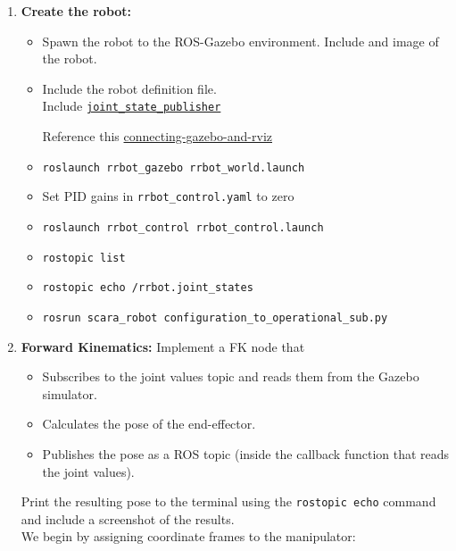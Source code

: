 \documentclass[10pt]{article}
\begin{document}
\setlength{\abovedisplayskip}{6pt}
\setlength{\belowdisplayskip}{3pt}
\setlength{\abovedisplayshortskip}{4pt}
\setlength{\belowdisplayshortskip}{4pt}

\begin{enumerate}
	\item \textbf{Create the robot:}
	
	\begin{itemize}
		\item Spawn the robot to the ROS-Gazebo environment. Include and image of the robot.
		
		\item Include the robot definition file.
		\\
		
		Include \href{http://wiki.ros.org/joint_state_publisher}{\texttt{joint\_state\_publisher}}
		
		Reference this \href{https://answers.ros.org/question/348008/connecting-gazebo-and-rviz/}{connecting-gazebo-and-rviz}
		
		\item \texttt{roslaunch rrbot\_gazebo rrbot\_world.launch}
		\item Set PID gains in \texttt{rrbot\_control.yaml} to zero
		\item \texttt{roslaunch rrbot\_control rrbot\_control.launch}
		\item \texttt{rostopic list}
		\item \texttt{rostopic echo /rrbot.joint\_states}
		\item \texttt{rosrun scara\_robot configuration\_to\_operational\_sub.py}
	\end{itemize}
	
	
	\item \textbf{Forward Kinematics:}
	Implement a FK node that
	
	\begin{itemize}	
		\item Subscribes to the joint values topic and reads them from the Gazebo simulator.
		\item Calculates the pose of the end-effector.
		\item Publishes the pose as a ROS topic (inside the callback function that reads the joint values).
	\end{itemize}
	Print the resulting pose to the terminal using the \texttt{rostopic echo} command and include a screenshot of the results.
	\\
	
	We begin by assigning coordinate frames to the manipulator:
	

\end{enumerate}
\end{document}
